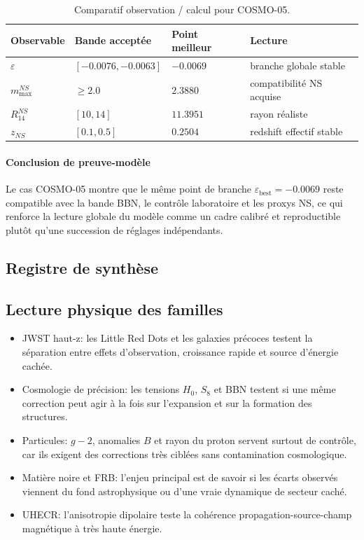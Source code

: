 \documentclass[11pt,a4paper]{article}
\begin{document}
\begin{table}[htbp]
\centering
\begin{tabular}{>{\raggedright\arraybackslash}p{3.2cm} >{\centering\arraybackslash}p{3.1cm} >{\centering\arraybackslash}p{3.3cm} >{\centering\arraybackslash}p{3.5cm}}
\toprule
Observable & Bande acceptée & Point meilleur & Lecture \\
\midrule
$\varepsilon$ & $[-0.0076,-0.0063]$ & $-0.0069$ & branche globale stable \\
$m_{\max}^{NS}$ & $\ge 2.0$ & $2.3880$ & compatibilité NS acquise \\
$R_{14}^{NS}$ & $[10,14]$ & $11.3951$ & rayon réaliste \\
$z_{NS}$ & $[0.1,0.5]$ & $0.2504$ & redshift effectif stable \\
\bottomrule
\end{tabular}
\caption{Comparatif observation / calcul pour COSMO-05.}
\end{table}

\paragraph{Conclusion de preuve-modèle}
Le cas COSMO-05 montre que le même point de branche $\varepsilon_{\mathrm{best}}=-0.0069$ reste compatible avec la bande BBN, le contrôle laboratoire et les proxys NS, ce qui renforce la lecture globale du modèle comme un cadre calibré et reproductible plutôt qu'une succession de réglages indépendants.

\subsection{Registre de synthèse}


\subsection{Lecture physique des familles}
\begin{itemize}
	\item JWST haut-z: les Little Red Dots et les galaxies précoces testent la séparation entre effets d'observation, croissance rapide et source d'énergie cachée.
	\item Cosmologie de précision: les tensions $H_0$, $S_8$ et BBN testent si une même correction peut agir à la fois sur l'expansion et sur la formation des structures.
	\item Particules: $g-2$, anomalies $B$ et rayon du proton servent surtout de contrôle, car ils exigent des corrections très ciblées sans contamination cosmologique.
	\item Matière noire et FRB: l'enjeu principal est de savoir si les écarts observés viennent du fond astrophysique ou d'une vraie dynamique de secteur caché.
	\item UHECR: l'anisotropie dipolaire teste la cohérence propagation-source-champ magnétique à très haute énergie.
\end{itemize}
\end{document}
